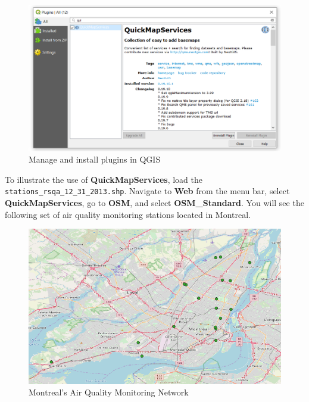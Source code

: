 \documentclass[]{book}
\theoremstyle{definition}
\theoremstyle{definition}
\theoremstyle{definition}
\theoremstyle{remark}
\begin{document}
\begin{figure}

{\centering \includegraphics[width=14.35in]{figures/QuickMapServices} 

}

\caption{Manage and install plugins in QGIS}\label{fig:unnamed-chunk-22}
\end{figure}

To illustrate the use of \textbf{QuickMapServices}, load the
\texttt{stations\_rsqa\_12\_31\_2013.shp}. Navigate to \textbf{Web} from
the menu bar, select \textbf{QuickMapServices}, go to \textbf{OSM}, and
select \textbf{OSM\_Standard}. You will see the following set of air
quality monitoring stations located in Montreal.

\begin{figure}

{\centering \includegraphics[width=11.42in]{figures/BaseMaps_Example} 

}

\caption{Montreal's Air Quality Monitoring Network}\label{fig:unnamed-chunk-23}
\end{figure}
\end{document}
